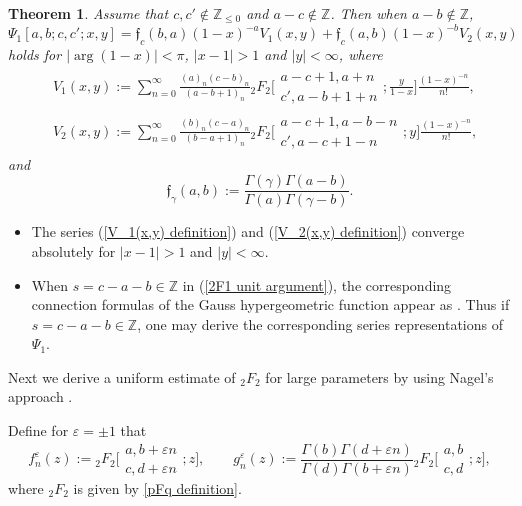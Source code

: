 \documentclass[pdftex]{sigma}
\numberwithin{equation}{section}
\newtheorem{Theorem}{Theorem}[section]
\newcommand{\ZZ}{\ensuremath{\mathbb{Z}}}
\begin{document}
\begin{Theorem}%
	Assume that $c,c'\notin\ZZ_{\leqslant 0}$ and $a-c\notin\ZZ$. Then when $a-b\notin\ZZ$,
	\begin{equation}\label{Psi_1 large arguments}
		\Psi_1[a,b;c,c';x,y]=\mathfrak{f}_c(b,a)(1-x)^{-a}V_1(x,y)+\mathfrak{f}_c(a,b)(1-x)^{-b}V_2(x,y)
	\end{equation}
	holds for $|{\arg}(1-x)|<\pi$, $|x-1|>1$ and $|y|<\infty$, where
	\begin{align}
		&V_1(x,y):=\sum_{n=0}^{\infty}\frac{(a)_n (c-b )_n}{ (a-b+1 )_n}
		{}_2F_2\biggl[\begin{matrix}
			a-c+1,a+n \\
			c',a-b+1+n
		\end{matrix};\frac{y}{1-x}\biggr]\frac{(1-x)^{-n}}{n!},\label{V_1(x,y) definition}\\
		&V_2(x,y):=\sum_{n=0}^{\infty}\frac{(b)_n (c-a )_n}{ (b-a+1 )_n}
		{}_2F_2\biggl[\begin{matrix}
			a-c+1,a-b-n\\
			c',a-c+1-n
		\end{matrix};y\biggr]\frac{(1-x)^{-n}}{n!},\label{V_2(x,y) definition}
	\end{align}
	and
	\[\mathfrak{f}_\gamma(a,b):=\frac{\Gamma(\gamma)\Gamma(a-b)}{\Gamma(a)\Gamma(\gamma-b)}.\]
\end{Theorem}

\begin{Remark}\quad
	\begin{itemize}\itemsep=0pt
		\item[(1)] The series (\ref{V_1(x,y) definition}) and (\ref{V_2(x,y) definition}) converge absolutely for $|x-1|>1$ and $|y|<\infty$.
		\item[(2)] When $s=c-a-b\in\ZZ$ in (\ref{2F1 unit argument}), the corresponding connection formulas of the Gauss hypergeometric function appear as \cite[equations~(15.3.10)--(15.3.12)]{Handbook-of-math-functions}. Thus if ${s=c-a-b\in\ZZ}$, one may derive the corresponding series representations of $\Psi_1$.
	\end{itemize}
\end{Remark}

Next we derive a uniform estimate of $_2F_2$ for large parameters by using Nagel's approach \mbox{\cite[equations~(A16)--(A19)]{Nagel-2004}}.

Define for $\varepsilon=\pm 1$ that
\begin{equation}\label{f_n(z) g_n(z) definition}
	f_n^{\varepsilon}(z):={}_2F_2\biggl[\begin{matrix}
		a,b+\varepsilon n\\
		c,d+\varepsilon n
	\end{matrix};z\biggr],\qquad g_n^{\varepsilon}(z):=\frac{\Gamma(b)\Gamma(d+\varepsilon n)}{\Gamma(d)\Gamma(b+\varepsilon n)}{}_2F_2\biggl[\begin{matrix}
		a,b\\
		c,d
	\end{matrix};z\biggr],
\end{equation}
where $_2F_{2}$ is given by \eqref{pFq definition}.
\end{document}
